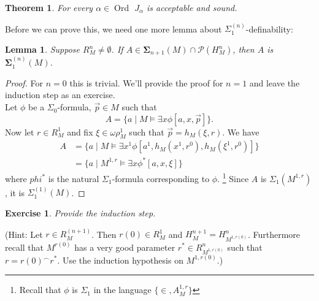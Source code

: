 \documentclass[12pt,a4paper]{article}
\theoremstyle{nicestyle}
\newtheorem{theorem}{Theorem}[subsection]
\newtheorem{exercise}{Exercise}[subsection]
\newtheorem{lemma}{Lemma}[subsection]
\DeclareMathOperator{\ord}{Ord}
\begin{document}

  \begin{theorem} \label{theorem: L is sound}
    For every $\alpha \in \ord$ $J_{\alpha}$ is acceptable and sound.
  \end{theorem}

  Before we can prove this, we need one more lemma about
  $\Sigma^{(n)}_{1}$-definability:

  \begin{lemma} \label{lemma: Sigma n+1 subsets of the n-th reduct}
    Suppose $R^{n}_{M} \neq \emptyset$. If
    $A \in \boldsymbol{\Sigma}_{n+1}(M) \cap \mathcal{P}(H^{n}_{M})$,
    then $A$ is $\boldsymbol{\Sigma}^{(n)}_{1}(M)$.
  \end{lemma}

  \begin{proof}
    For $n = 0$ this is trivial. We'll provide the proof for $n = 1$
    and leave the induction step as an exercise. \\
    Let $\phi$ be a $\Sigma_{0}$-formula, $\vec{p} \in M$ such that
    \[
      A = \{ a \mid M \models \exists x \phi[a,x,\vec{p}] \}.
    \]
    Now let $r \in R^{1}_{M}$ and fix $\xi \in \omega\rho^{1}_{M}$
    such that $\vec{p} = h_{M}(\xi, r)$. We have
    \begin{align*}
      A & = \{ a \mid M \models \exists x^{1} \phi[a^{1}, h_{M}(x^{1}, r^{0}), h_{M}(\xi^{1}, r^{0})] \} \\
      &= \{ a \mid M^{1, r} \models \exists x \phi^{*}[a, x, \xi] \}
    \end{align*}
    where $phi^{*}$ is the natural $\Sigma_{1}$-formula corresponding
    to $\phi$. \footnote{Recall that $\phi$ is $\Sigma_{1}$ in the
      language $\{ \in, A^{1, r}_{M} \}$} Since $A$ is
    $\Sigma_{1}(M^{1,r})$, it is $\Sigma^{(1)}_{1}(M)$.
  \end{proof}

  \begin{exercise}
    Provide the induction step.
  \end{exercise}

  (Hint: Let $r \in R^{(n+1)}_{M}$. Then $r(0) \in R^{1}_{M}$ and
  $H^{n+1}_{M} = H^{n}_{M^{1,r(0)}}$. Furthermore recall that
  $M^{r(0)}$ has a very good parameter $r^{*} \in R^{n}_{M^{1,r(0)}}$
  such that $r = r(0) ^{\frown} r^{*}$. Use the induction hypothesis
  on $M^{1, r(0)}$.)
\end{document}
